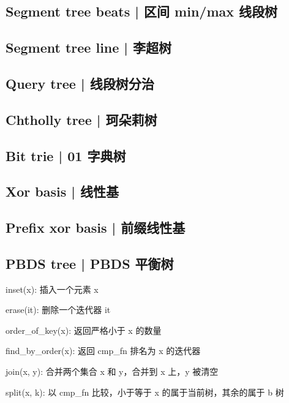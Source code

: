 \documentclass[8pt,a4paper]{article}
\newcommand{\code}[1]{
    
}
\newcommand{\txt}[1]{\par\noindent\footnotesize #1}
\begin{document}
\begin{multicols}{2}
        \code{src/data_structure/segment_tree_persistent.cpp}

    \subsection{Segment tree beats | 区间 min/max 线段树}
        \code{src/data_structure/segment_tree_beats.cpp}

    \subsection{Segment tree line | 李超树}
        \code{src/data_structure/segment_tree_line.cpp}

    \subsection{Query tree | 线段树分治}
        \code{src/data_structure/query_tree.cpp}

    \subsection{Chtholly tree | 珂朵莉树}
        \code{src/data_structure/chtholly_tree.cpp}

    \subsection{Bit trie | 01 字典树}
        \code{src/data_structure/bit_trie.cpp}

    \subsection{Xor basis | 线性基}
        \code{src/data_structure/hamel.cpp}

    \subsection{Prefix xor basis | 前缀线性基}
        \code{src/data_structure/prefixhamel.cpp}

    \subsection{PBDS tree | PBDS 平衡树}
        \txt{inset(x): 插入一个元素 x}
        \txt{erase(it): 删除一个迭代器 it}
        \txt{order\_of\_key(x): 返回严格小于 x 的数量}
        \txt{find\_by\_order(x): 返回 cmp\_fn 排名为 x 的迭代器}
        \txt{join(x, y): 合并两个集合 x 和 y，合并到 x 上，y 被清空}
        \txt{split(x, k): 以 cmp\_fn 比较，小于等于 x 的属于当前树，其余的属于 b 树}


\end{multicols}
\end{document}
